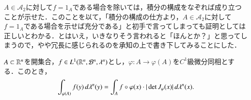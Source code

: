\begin{dig}
$A \in \mathcal{A}_2$に対して$f = 1_A$である場合を除いては，積分の構成をなぞれば成り立つことが示せた．このことを以て，「積分の構成の仕方より，$A \in \mathcal{A}_2$に対して$f = 1_A$である場合を示せば充分である」と初手で言ってしまっても証明としては正しいとわかる．とはいえ，いきなりそう言われると「ほんとか？」と思ってしまうので，やや冗長に感じられるのを承知の上で書き下してみることにした．
\end{dig}

\begin{thm}$A \subset \mathbb{R}^n$を開集合，$f \in L^1(\mathbb{R}^n, \mathcal{B}^n ,\lambda^n)$とし，$\varphi \colon A \to \varphi(A)$を$C^1$級微分同相とする．このとき，
\begin{equation}
\int_{\varphi(A)} f(y) \mathop{}\!d\lambda^n(y) = \int_A f \circ \varphi(x) \cdot | \det J_\varphi(x) | \mathop{}\!d \lambda^n(x).
\end{equation}
\end{thm}

